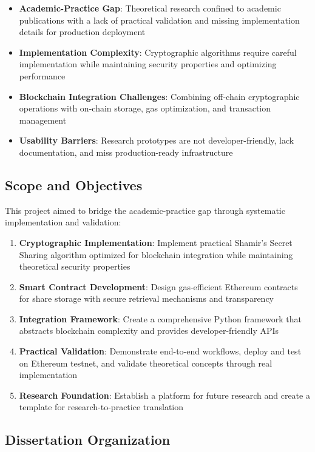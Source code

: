 \documentclass[12pt,a4paper]{article}
\begin{document}
\begin{itemize}[leftmargin=15pt]
    \item \textbf{Academic-Practice Gap}: Theoretical research confined to academic publications with a lack of practical validation and missing implementation details for production deployment
    \item \textbf{Implementation Complexity}: Cryptographic algorithms require careful implementation while maintaining security properties and optimizing performance
    \item \textbf{Blockchain Integration Challenges}: Combining off-chain cryptographic operations with on-chain storage, gas optimization, and transaction management
    \item \textbf{Usability Barriers}: Research prototypes are not developer-friendly, lack documentation, and miss production-ready infrastructure
\end{itemize}

\subsection{Scope and Objectives}

This project aimed to bridge the academic-practice gap through systematic implementation and validation:

\begin{enumerate}[leftmargin=15pt]
    \item \textbf{Cryptographic Implementation}: Implement practical Shamir's Secret Sharing algorithm optimized for blockchain integration while maintaining theoretical security properties
    \item \textbf{Smart Contract Development}: Design gas-efficient Ethereum contracts for share storage with secure retrieval mechanisms and transparency
    \item \textbf{Integration Framework}: Create a comprehensive Python framework that abstracts blockchain complexity and provides developer-friendly APIs
    \item \textbf{Practical Validation}: Demonstrate end-to-end workflows, deploy and test on Ethereum testnet, and validate theoretical concepts through real implementation
    \item \textbf{Research Foundation}: Establish a platform for future research and create a template for research-to-practice translation
\end{enumerate}

\subsection{Dissertation Organization}
\end{document}
